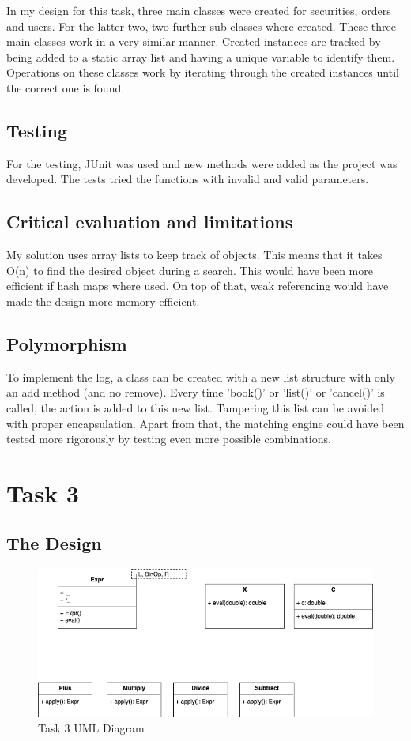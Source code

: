 \documentclass[a4paper, 12pt]{report}
\begin{document}
In my design for this task, three main classes were created for securities, orders and users. For the latter two, two further sub classes where created. These three main classes work in a very similar manner. Created instances are tracked by being added to a static array list and having a unique variable to identify them. Operations on these classes work by iterating through the created instances until the correct one is found.


\subsection{Testing}
For the testing, JUnit was used and new methods were added as the project was developed. The tests tried the functions with invalid and valid parameters.

\subsection{Critical evaluation and limitations}
My solution uses array lists to keep track of objects. This means that it takes O(n) to find the desired object during a search. This would have been more efficient if hash maps where used. On top of that, weak referencing would have made the design more memory efficient.

\subsection{Polymorphism}
To implement the log, a class can be created with a new list structure with only an add method (and no remove). Every time 'book()' or 'list()' or 'cancel()' is called, the action is added to this new list. Tampering this list can be avoided with proper encapsulation.
\linebreak
Apart from that, the matching engine could have been tested more rigorously by testing even more possible combinations.

\section{Task 3}

\subsection{The Design}

\begin{figure}[H]
    \centering
    \includegraphics[width=1\textwidth]{"UML 3"}
    \caption{Task 3 UML Diagram}
\end{figure}
\end{document}
